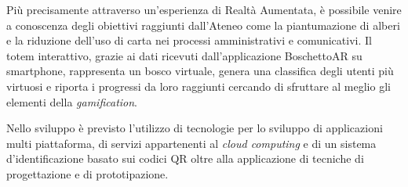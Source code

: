 Più precisamente attraverso un'esperienza di Realtà Aumentata, è possibile venire a conoscenza degli obiettivi raggiunti dall'Ateneo come la piantumazione di alberi e la riduzione dell'uso di carta nei processi amministrativi e comunicativi.
Il totem interattivo, grazie ai dati ricevuti dall'applicazione BoschettoAR su smartphone, rappresenta un bosco virtuale, genera una classifica degli utenti più virtuosi e riporta i progressi da loro raggiunti cercando di sfruttare al meglio gli elementi della \textit{gamification}.
\vspace{10pt}

Nello sviluppo è previsto l'utilizzo di tecnologie per lo sviluppo di applicazioni multi piattaforma, di servizi appartenenti al \textit{cloud computing} e di un sistema d'identificazione basato sui codici QR oltre alla applicazione di tecniche di progettazione e di prototipazione.

